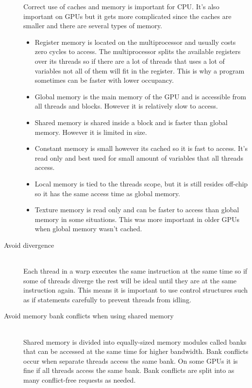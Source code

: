 \documentclass[10pt,a4paper]{report}
\begin{document}
\begin{description}
  Correct use of caches and memory is important for CPU\cite{drepper2007cpumemory}. It's also important on GPUs but it gets more complicated since the caches are smaller and there are several types of memory.
    \begin{itemize}
    \item Register memory is located on the multiprocessor and usually costs zero cycles to access. The multiprocessor splits the available registers over its threads so if there are a lot of threads that uses a lot of variables not all of them will fit in the register. This is why a program sometimes can be faster with lower occupancy.
    \item Global memory is the main memory of the GPU and is accessible from all threads and blocks. However it is relatively slow to access.
    \item Shared memory is shared inside a block and is faster than global memory. However it is limited in size.
    \item Constant memory is small however its cached so it is fast to access. It's read only and best used for small amount of variables that all threads access.
    \item Local memory is tied to the threads scope, but it is still resides off-chip so it has the same access time as global memory.
    \item Texture memory is read only and can be faster to access than global memory in some situations. This was more important in older GPUs when global memory wasn't cached.\cite{plink_gpu, cuda}
  \end{itemize}
  \item[Avoid divergence] \hfill \\
  Each thread in a warp executes the same instruction at the same time so if some of threads diverge the rest will be ideal until they are at the same instruction again. This means it is important to use control structures such as if statements carefully to prevent threads from idling.\cite{cuda, cuda_best_practice}
  \item[Avoid memory bank conflicts when using shared memory] \hfill \\
  Shared memory is divided into equally-sized memory modules called banks that can be accessed at the same time for higher bandwidth. Bank conflicts occur when separate threads access the same bank. On some GPUs it is fine if all threads access the same bank. Bank conflicts are split into as many conflict-free requests as needed.\cite{cuda, cuda_best_practice}

\end{description}
\end{document}
